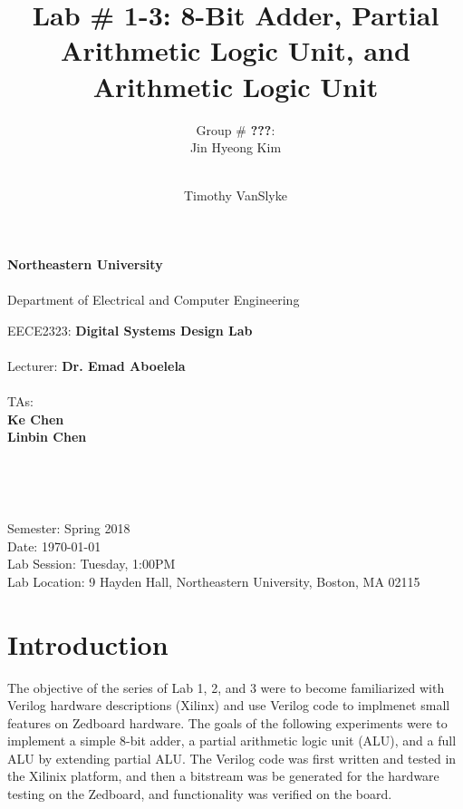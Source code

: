 \documentclass[12pt, letterpaper]{article}
\title{Lab \# 1-3: \textbf{8-Bit Adder, Partial Arithmetic Logic Unit, and Arithmetic Logic Unit}}
\author{Group \# \textbf{\color{red}???}:\\ Jin Hyeong Kim \and\\ Timothy VanSlyke}
\begin{document}
\begin{titlepage}
	\begin{center}
		{\Large
			\textbf{Northeastern University}\\
			~\\
			Department of Electrical and Computer Engineering\\ 
		}

		\vfill

		{\large
			EECE2323: \textbf{Digital Systems Design Lab}\\
			~\\
			Lecturer: \textbf{Dr. Emad Aboelela}\\
			~\\
			TAs:\\
			\textbf{Ke Chen}\\
			\textbf{Linbin Chen}\\
		}
	
		\vfill

		{\Large \thetitle}\\
	
		\vfill

		{\large \theauthor}\\

		\vfill

		{\large
			Semester: Spring 2018\\
			Date: \today\\
			Lab Session: Tuesday, 1:00PM\\ 
			Lab Location: 9 Hayden Hall, Northeastern University, Boston, MA 02115\\
		}

	\end{center}
\end{titlepage}

\hypersetup{linkcolor=black}
\tableofcontents
\hypersetup{linkcolor=cyan}

\newpage
\section{Introduction}
\begin{flushleft} 
\doublespacing The objective of the series of Lab 1, 2, and 3 were to become familiarized with Verilog hardware descriptions (Xilinx) and use Verilog code to implmenet small features on Zedboard hardware. The goals of the following experiments were to implement a simple 8-bit adder, a partial arithmetic logic unit (ALU), and a full ALU by extending partial ALU. The Verilog code was first written and tested in the Xilinix platform, and then a bitstream was be generated for the hardware testing on the Zedboard, and functionality was verified on the board.
\end{flushleft}
\end{document}
